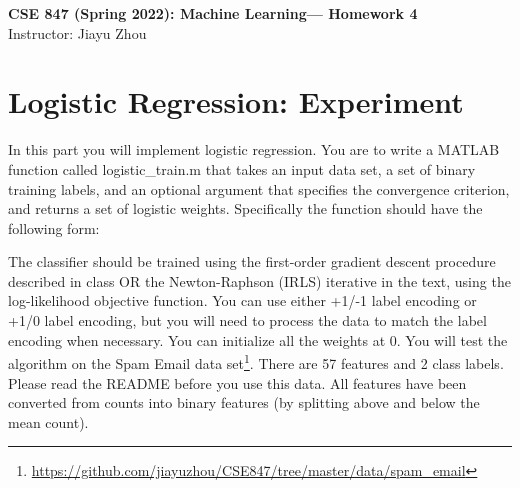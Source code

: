 \documentclass[11pt]{article}
\begin{document}
\thispagestyle {empty}

\newcommand{\lsp}[1]{\large\renewcommand{\baselinestretch}{#1}\normalsize}
\newcommand{\hsp}{\hspace{.2in}}
\newcommand{\comment}[1]{}
\newtheorem{thm}{Theorem}[section]
\newtheorem{lem}{Lemma}[section]
\newtheorem{cor}{Corollary}[section]
\newtheorem{prop}{Proposition}[section]
\newtheorem{problem}{Problem}[section]

\newcommand{\R}{{\rm\hbox{I\kern-.15em R}}}
\newcommand{\IR}{{\rm\hbox{I\kern-.15em R}}}
\newcommand{\IN}{{\rm\hbox{I\kern-.15em N}}}
\newcommand{\IZ}{{\sf\hbox{Z\kern-.40em Z}}}
\newcommand{\IS}{{\rm\hbox{S\kern-.45em S}}}
\newcommand{\Real}{I\!\!R}


\newcommand{\linesep}{\vspace{.2cm}\hrule\vspace{0.2cm}}
\newcommand{\categorysep}{\vspace{0.5cm}}
\newcommand{\entrysep}{\vspace{0cm}}

\newcommand{\category}[1]{\categorysep
                  \noindent {\bf \large #1}
              \linesep}

\pagestyle{empty}

\begin{center}
{\large \textbf{CSE 847 (Spring 2022): Machine Learning--- Homework 4}} \\
 Instructor: Jiayu Zhou 
\end{center}

\section{Logistic Regression: Experiment}
In this part you will implement logistic regression.  You are to write a
MATLAB function called logistic\_train.m that takes an input data set, a set of
binary training labels, and an optional argument that specifies the
convergence criterion, and returns a set of logistic weights. Specifically the
function should have the following form:


The classifier should be trained using the first-order gradient descent 
procedure described in class OR the Newton-Raphson (IRLS) iterative in the text, 
using the log-likelihood objective function. You can use either +1/-1 label encoding or +1/0 label encoding, but you will need to process the data to match the label encoding when necessary. You can initialize all the weights at 0. You will test the
algorithm on the Spam Email data set\footnote{\url{https://github.com/jiayuzhou/CSE847/tree/master/data/spam_email}}. There are 57 features and 2
class labels. Please read the README before you use this data. All features
have been converted from counts into binary features (by splitting above and
below the mean count).
\end{document}
